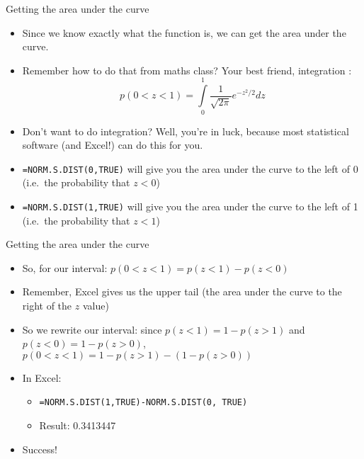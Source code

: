 \begin{frame}{Getting the area under the curve}

\begin{itemize}
\itemsep1pt\parskip0pt
\item
  Since we know exactly what the function is, we can get the area under
  the curve.
\item
  Remember how to do that from maths class? Your best friend,
  integration :
  \[ p (0 < z < 1) = \int\limits_{0}^{1} \frac{1}{\sqrt{2 \pi}} e^{-z^2/2} dz\]
\item
  Don't want to do integration? Well, you're in luck, because most
  statistical software (and Excel!) can do this for you.
\item
  \texttt{=NORM.S.DIST(0,TRUE)} will give you the area under the curve
  to the left of 0 (i.e.~the probability that \(z < 0\))
\item
  \texttt{=NORM.S.DIST(1,TRUE)} will give you the area under the curve
  to the left of 1 (i.e.~the probability that \(z < 1\))
\end{itemize}

\end{frame}

\begin{frame}{Getting the area under the curve}

\begin{itemize}
\itemsep1pt\parskip0pt
\item
  So, for our interval: \(p (0 < z < 1) = p(z < 1) - p(z < 0)\)
\item
  Remember, Excel gives us the upper tail (the area under the curve to
  the right of the \(z\) value)
\item
  So we rewrite our interval: since \(p(z < 1) = 1-p(z > 1)\) and
  \(p(z < 0) = 1-p(z > 0)\),
  \(p (0 < z < 1) = 1-p(z > 1) - (1-p(z > 0))\)
\item
  In Excel:

  \begin{itemize}
  \itemsep1pt\parskip0pt
  \item
    \texttt{=NORM.S.DIST(1,TRUE)-NORM.S.DIST(0, TRUE)}
  \item
    Result: 0.3413447
  \end{itemize}
\item
  Success!
\end{itemize}

\end{frame}

